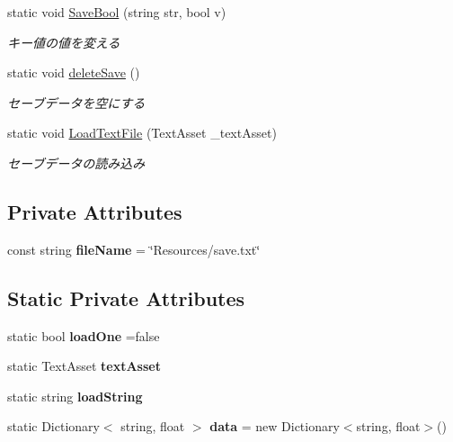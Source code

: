 \begin{DoxyCompactItemize}
static void \hyperlink{class_save_data_a6e61172157b03b903e28dbbaf196ea7e}{Save\+Bool} (string str, bool v)
\begin{DoxyCompactList}\small\item\em キー値の値を変える \end{DoxyCompactList}\item 
static void \hyperlink{class_save_data_a9fa3e3db072ebafa6023e8cb2be35eb5}{delete\+Save} ()
\begin{DoxyCompactList}\small\item\em セーブデータを空にする \end{DoxyCompactList}\item 
static void \hyperlink{class_save_data_a8e9426f54bee1a34f8b95f083d13bd7d}{Load\+Text\+File} (Text\+Asset \+\_\+text\+Asset)
\begin{DoxyCompactList}\small\item\em セーブデータの読み込み \end{DoxyCompactList}\end{DoxyCompactItemize}
\subsection*{Private Attributes}
\begin{DoxyCompactItemize}
\item 
\mbox{\label{class_save_data_a178c1678cf8efc7176c9e1ca5c3af11e}} 
const string {\bfseries file\+Name} = \char`\"{}Resources/save.\+txt\char`\"{}
\end{DoxyCompactItemize}
\subsection*{Static Private Attributes}
\begin{DoxyCompactItemize}
\item 
\mbox{\label{class_save_data_ab0f0c2e0b263461e87a6c935b68934f1}} 
static bool {\bfseries load\+One} =false
\item 
\mbox{\label{class_save_data_a1f4aed1d4b84cd1d72c03b77c289213d}} 
static Text\+Asset {\bfseries text\+Asset}
\item 
\mbox{\label{class_save_data_ad878fd92309d2da227b2f107530392de}} 
static string {\bfseries load\+String}
\item 
\mbox{\label{class_save_data_acb7c0aaee9ab20de0a5c5ae2bb440675}} 
static Dictionary$<$ string, float $>$ {\bfseries data} = new Dictionary$<$string, float$>$()
\end{DoxyCompactItemize}


